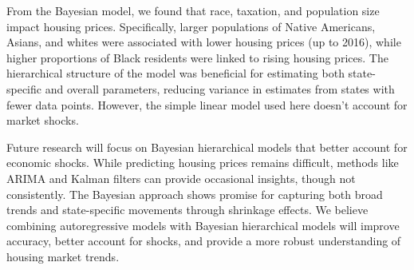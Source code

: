 \documentclass[11pt]{amsart}
\begin{document}
From the Bayesian model, we found that race, taxation, and population size impact housing prices. Specifically, larger populations of Native Americans, Asians, and whites were associated with lower housing prices (up to 2016), while higher proportions of Black residents were linked to rising housing prices. The hierarchical structure of the model was beneficial for estimating both state-specific and overall parameters, reducing variance in estimates from states with fewer data points. However, the simple linear model used here doesn’t account for market shocks.

Future research will focus on Bayesian hierarchical models that better account for economic shocks. While predicting housing prices remains difficult, methods like ARIMA and Kalman filters can provide occasional insights, though not consistently. The Bayesian approach shows promise for capturing both broad trends and state-specific movements through shrinkage effects. We believe combining autoregressive models with Bayesian hierarchical models will improve accuracy, better account for shocks, and provide a more robust understanding of housing market trends.


\end{document}

